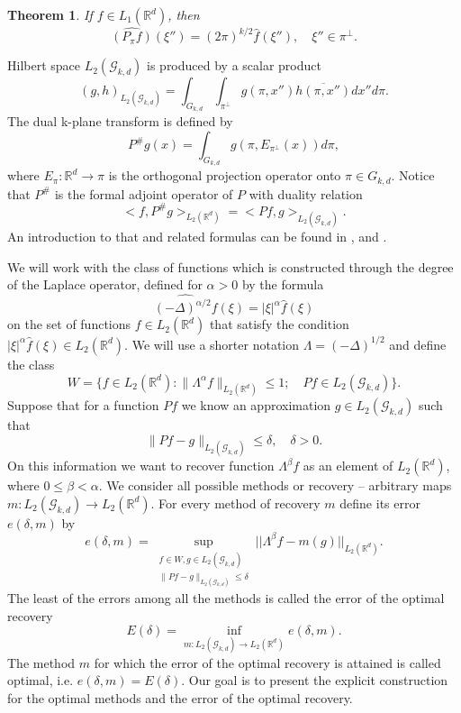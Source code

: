\documentclass[12pt]{iopart}
\newtheorem{theorem}{Theorem}
\begin{document}
	\begin{theorem}
		\label{projection}
		If $f\in L_1(\mathbb R^d)$, then
		$$\widehat{(P_\pi f)}(\xi'')=(2\pi)^{k/2}\widehat f(\xi''),\quad \xi''\in\pi^\perp.$$
	\end{theorem}
	Hilbert space $L_2(\mathcal G_{k,d})$ is produced by a scalar product	
	$$(g,h)_{L_2(\mathcal G_{k,d})}=\int_{G_{k,d}}\int_{\pi^\perp}g(\pi,x'')\overline{h(\pi,x'')}dx''d\pi.$$
	The dual k-plane transform is defined by
	$$P^\#g(x) = \int_{G_{k,d}}g(\pi,E_{\pi^\perp}(x))d\pi,$$
	where $E_\pi:\mathbb R^d\rightarrow\pi$ is the orthogonal projection operator onto $\pi\in G_{k,d}$.
	Notice that $P^\#$ is the formal adjoint operator of $P$ with duality relation
	\begin{equation}
	\label{duality}
	<f,P^\#g>_{L_2(\mathbb R^d)} = <Pf,g>_{L_2(\mathcal G_{k,d})}.
	\end{equation}
	An introduction to that and related formulas can be found in \cite{H},\cite{K} and \cite{MA}.
	
	We will work with the class of functions which is constructed through the degree of the Laplace operator, defined for $\alpha> 0$ by the formula 
	$$\widehat{(-\Delta)^{\alpha/2}f}(\xi)=|\xi|^\alpha \widehat f(\xi)$$ on the set of functions $f\in L_2(\mathbb R^d)$ that satisfy the condition $|\xi|^\alpha\widehat f(\xi)\in L_2(\mathbb R^d)$.
	We will use a shorter notation $\Lambda=(-\Delta)^{1/2}$ and define the class 
	$$ W=\{f\in L_2(\mathbb R^d) :
	\|\Lambda^\alpha f\|_{L_2(\mathbb R^d)}\leqslant  1;\quad Pf\in L_2(\mathcal G_{k,d}) \}.  $$
	Suppose that for a function $Pf$ we know an approximation $g\in L_2(\mathcal G_{k,d})$ such that
	$$\|Pf-g\|_{L_2(\mathcal G_{k,d})}\leqslant\delta, \quad\delta>0.$$
	On this information we want to recover function $\Lambda^\beta f$ as an element of $ L_2(\mathbb R^d)$, where $0\leqslant\beta<\alpha$. We consider all possible methods or recovery -- arbitrary maps $m:L_2(\mathcal G_{k,d})\rightarrow L_2(\mathbb R^d)$. For every method of recovery $m$ define its error $e(\delta,m)$ by
	\[
	e(\delta,m)=\sup_{
		\begin{smallmatrix}
		f\in W, g\in L_2(\mathcal G_{k,d})\\ 
		\|Pf-g\|_{L_2(\mathcal G_{k,d})}\leqslant \delta
		\end{smallmatrix}} ||\Lambda^\beta f-m(g)||_{L_2(\mathbb R^d)}.
	\] 
	The least of the errors among all the methods is called the error of the optimal recovery
	\begin{equation}
	\label{opter}
	E(\delta)=\inf_{m:L_2(\mathcal G_{k,d})\rightarrow L_2(\mathbb R^d)}e(\delta,m).
	\end{equation}
	The method $m$ for which the error of the optimal recovery is attained is called optimal, i.e. $e(\delta,m)=E(\delta)$. Our goal is to present the explicit construction for the optimal methods and the error of the optimal recovery.
	
\end{document}

